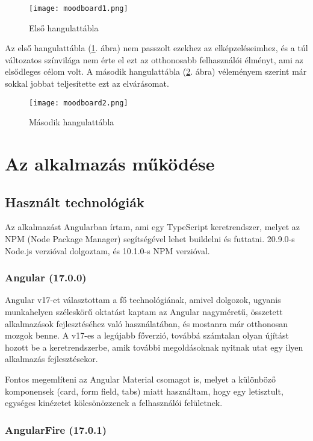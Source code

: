\documentclass[a4paper,12pt]{report}
\begin{document}
\begin{figure}
    \centering
    \texttt{[image: moodboard1.png]}
    \caption{Első hangulattábla}
    \label{fig:moodboard1}
\end{figure}

Az első hangulattábla (\ref{fig:moodboard1}. ábra) nem passzolt ezekhez az elképzeléseimhez, és a túl változatos színvilága nem érte el ezt az otthonosabb felhasználói élményt, ami az elsődleges célom volt. A második hangulattábla (\ref{fig:moodboard2}. ábra) véleményem szerint már sokkal jobbat teljesítette ezt az elvárásomat.

\begin{figure}
    \centering
    \texttt{[image: moodboard2.png]}
    \caption{Második hangulattábla}
    \label{fig:moodboard2}
\end{figure}

\chapter{Az alkalmazás működése}

\section{Használt technológiák}

Az alkalmazást Angularban \cite{angular} írtam, ami egy TypeScript keretrendszer, melyet az NPM (Node Package Manager) segítségével lehet buildelni és futtatni. 20.9.0-s Node.js verzióval dolgoztam, és 10.1.0-s NPM verzióval.

\subsection{Angular (17.0.0)}

Angular v17-et választottam a fő technológiának, amivel dolgozok, ugyanis munkahelyen széleskörű oktatást kaptam az Angular nagyméretű, összetett alkalmazások fejlesztéséhez való használatában, és mostanra már otthonosan mozgok benne. A v17-es a legújabb főverzió, továbbá számtalan olyan újítást hozott be a keretrendszerbe, amik további megoldásoknak nyitnak utat egy ilyen alkalmazás fejlesztésekor.

Fontos megemlíteni az Angular Material csomagot is, melyet a különböző komponensek (card, form field, tabs) miatt használtam, hogy egy letisztult, egységes kinézetet kölcsönözzenek a felhasználói felületnek.

\subsection{AngularFire (17.0.1)}
\end{document}
